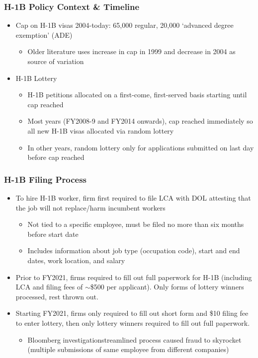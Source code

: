\documentclass[xcolor=dvipsnames, compress, 12pt, aspectratio=169, handout]{beamer}
\begin{document}
\appendix 

\begin{frame}\label{h1bpolicy}
    \frametitle{H-1B Policy Context \& Timeline \hyperlink{data}{}}
    \begin{itemize}
        \item Cap on H-1B visas 2004-today: 65,000 regular, 20,000 `advanced degree exemption' (ADE)
        \begin{itemize}
            \item Older literature uses increase in cap in 1999 and decrease in 2004 as source of variation
        \end{itemize}
        \item H-1B Lottery 
        \begin{itemize}
            \item H-1B petitions allocated on a first-come, first-served basis starting until cap reached 
            \item Most years (FY2008-9 and FY2014 onwards), cap reached immediately so all new H-1B visas allocated via random lottery 
            \item In other years, random lottery only for applications submitted on last day before cap reached 
        \end{itemize}
    \end{itemize}
\end{frame}

\begin{frame}\label{h1bfiling}
    \frametitle{H-1B Filing Process \hyperlink{data}{}}
        \begin{itemize}
            \item To hire H-1B worker, firm first required to file LCA with DOL attesting that the job will not replace/harm incumbent workers
            \begin{itemize}
                \item Not tied to a specific employee, must be filed no more than six months before start date
                \item Includes information about job type (occupation code), start and end dates, work location, and salary
            \end{itemize}
            \item Prior to FY2021, firms required to fill out full paperwork for H-1B (including LCA and filing fees of $\sim$\$500 per applicant). Only forms of lottery winners processed, rest thrown out. 
            \item Starting FY2021, firms only required to fill out short form and \$10 filing fee to enter lottery, then only lottery winners required to fill out full paperwork. 
            \begin{itemize}
                \item Bloomberg investigation\textemdash streamlined process caused fraud to skyrocket (multiple submissions of same employee from different companies)
            \end{itemize}
        \end{itemize}
\end{frame}
\end{document}
